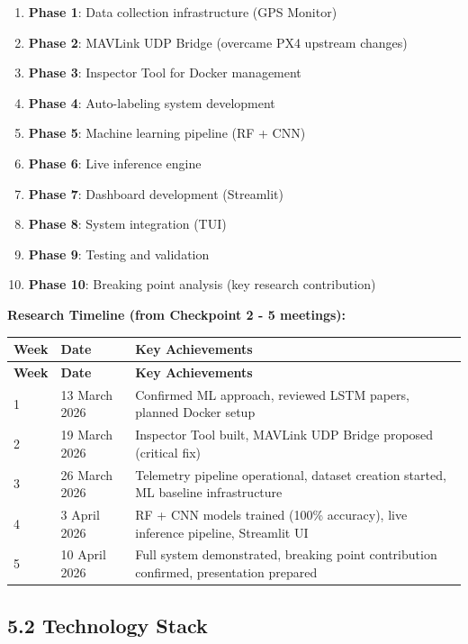 \documentclass[12pt,a4paper]{article}
\begin{document}
\begin{enumerate}
    \item \textbf{Phase 1}: Data collection infrastructure (GPS Monitor)
    \item \textbf{Phase 2}: MAVLink UDP Bridge (overcame PX4 upstream changes)
    \item \textbf{Phase 3}: Inspector Tool for Docker management
    \item \textbf{Phase 4}: Auto-labeling system development
    \item \textbf{Phase 5}: Machine learning pipeline (RF + CNN)
    \item \textbf{Phase 6}: Live inference engine
    \item \textbf{Phase 7}: Dashboard development (Streamlit)
    \item \textbf{Phase 8}: System integration (TUI)
    \item \textbf{Phase 9}: Testing and validation
    \item \textbf{Phase 10}: Breaking point analysis (key research contribution)
\end{enumerate}

\textbf{Research Timeline (from Checkpoint 2 - 5 meetings):}
\begin{longtable}{|p{3cm}|p{4cm}|p{8cm}|}
\hline
\textbf{Week} & \textbf{Date} & \textbf{Key Achievements} \\
\hline
\endfirsthead
\hline
\textbf{Week} & \textbf{Date} & \textbf{Key Achievements} \\
\hline
\endhead
\hline
1 & 13 March 2026 & Confirmed ML approach, reviewed LSTM papers, planned Docker setup \\
\hline
2 & 19 March 2026 & Inspector Tool built, MAVLink UDP Bridge proposed (critical fix) \\
\hline
3 & 26 March 2026 & Telemetry pipeline operational, dataset creation started, ML baseline infrastructure \\
\hline
4 & 3 April 2026 & RF + CNN models trained (100\% accuracy), live inference pipeline, Streamlit UI \\
\hline
5 & 10 April 2026 & Full system demonstrated, breaking point contribution confirmed, presentation prepared \\
\hline
\end{longtable}

\subsection{5.2 Technology Stack}
\end{document}
